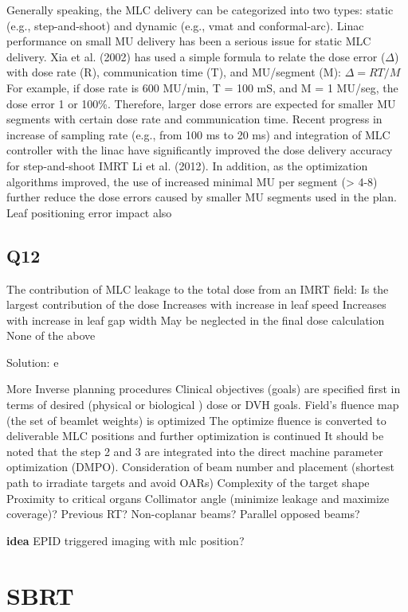 \documentclass[]{book}
\theoremstyle{definition}
\theoremstyle{definition}
\theoremstyle{definition}
\theoremstyle{remark}
\begin{document}
Generally speaking, the MLC delivery can be categorized into two types:
static (e.g., step-and-shoot) and dynamic (e.g., vmat and
conformal-arc). Linac performance on small MU delivery has been a
serious issue for static MLC delivery. Xia et al. (2002) has used a
simple formula to relate the dose error (\(\Delta\)) with dose rate (R),
communication time (T), and MU/segment (M): \(\Delta =RT/M\) For
example, if dose rate is 600 MU/min, T = 100 mS, and M = 1 MU/seg, the
dose error 1 or 100\%. Therefore, larger dose errors are expected for
smaller MU segments with certain dose rate and communication time.
Recent progress in increase of sampling rate (e.g., from 100 ms to 20
ms) and integration of MLC controller with the linac have significantly
improved the dose delivery accuracy for step-and-shoot IMRT Li et al.
(2012). In addition, as the optimization algorithms improved, the use of
increased minimal MU per segment (\textgreater{} 4-8) further reduce the
dose errors caused by smaller MU segments used in the plan. Leaf
positioning error impact also

\section{Q12}\label{q12}

The contribution of MLC leakage to the total dose from an IMRT field: Is
the largest contribution of the dose Increases with increase in leaf
speed Increases with increase in leaf gap width May be neglected in the
final dose calculation None of the above

Solution: e

More Inverse planning procedures Clinical objectives (goals) are
specified first in terms of desired (physical or biological ) dose or
DVH goals. Field's fluence map (the set of beamlet weights) is optimized
The optimize fluence is converted to deliverable MLC positions and
further optimization is continued It should be noted that the step 2 and
3 are integrated into the direct machine parameter optimization (DMPO).
Consideration of beam number and placement (shortest path to irradiate
targets and avoid OARs) Complexity of the target shape Proximity to
critical organs Collimator angle (minimize leakage and maximize
coverage)? Previous RT? Non-coplanar beams? Parallel opposed beams?

\textbf{idea} EPID triggered imaging with mlc position?

\chapter{SBRT}\label{sbrt}
\end{document}
